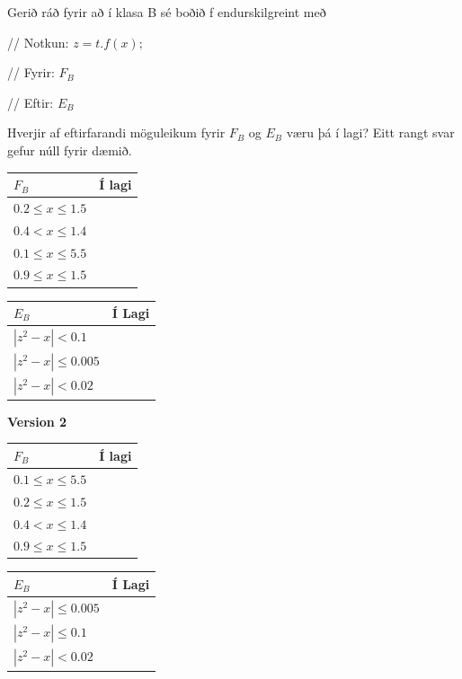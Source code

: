 \documentclass{article}
\newcommand{\bo}[1]{\textbf{#1}}
\begin{document}
    Gerið ráð fyrir að í klasa B sé boðið f endurskilgreint með


    // Notkun: $z = t.f(x);$


    // Fyrir: $F_B$


    // Eftir: $E_B$


    Hverjir af eftirfarandi möguleikum fyrir $F_B$ og $E_B$ væru þá í lagi? Eitt
    rangt svar gefur núll fyrir dæmið.

    \begin{tabularx}{\textwidth}{|X|X|}
        \hline
        $F_B$ & \bo{Í lagi} \\ \hline
        $0.2 \leq x \leq 1.5 $ & \\ \hline
        $0.4 < x \leq 1.4 $ & \\ \hline
        $0.1 \leq x \leq 5.5 $ & \\ \hline
        $0.9 \leq x \leq 1.5 $& \\ \hline
        
    \end{tabularx}

    \begin{tabularx}{\textwidth}{|X|X|}
        \hline
        $E_B$ & \bo{Í Lagi} \\ \hline
        $|z^2 - x| < 0.1 $ & \\ \hline
        $|z^2 - x| \leq 0.005 $ & \\ \hline
        $|z^2 - x| < 0.02 $ & \\ \hline
        
    \end{tabularx}


    \bo{Version 2}
    \begin{tabularx}{\textwidth}{|X|X|}
        \hline
        $F_B$ & \bo{Í lagi} \\ \hline
        $0.1 \leq x \leq 5.5 $ & \\ \hline
        $0.2 \leq x \leq 1.5 $ & \\ \hline
        $0.4 < x \leq 1.4 $ & \\ \hline
        $0.9 \leq x \leq 1.5 $& \\ \hline
        
    \end{tabularx}
    \begin{tabularx}{\textwidth}{|X|X|}
        \hline
        $E_B$ & \bo{Í Lagi} \\ \hline
        $|z^2 - x| \leq 0.005 $ & \\ \hline
        $|z^2 - x| \leq 0.1 $ & \\ \hline
        $|z^2 - x| < 0.02 $ & \\ \hline
        
    \end{tabularx}
\end{document}
